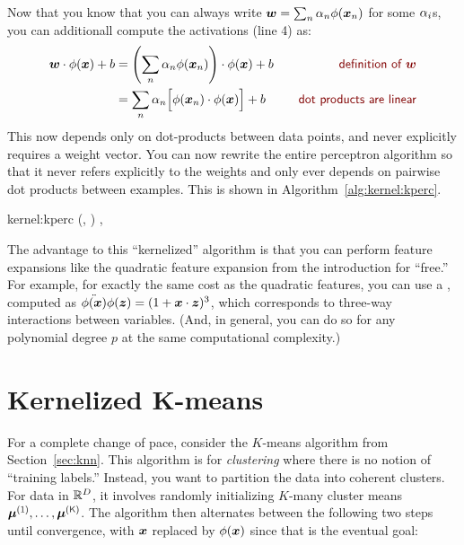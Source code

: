 Now that you know that you can always write ${\boldsymbol{w}} = \sum_n \alpha_n
\phi({\boldsymbol{x}}_n)$ for some $\alpha_i$s, you can additionall compute the
activations (line 4) as:
%
\begin{align}
\dotp{\vw}{\phi(\vx)}+b
&= \dotp{\left( \sum_n \al_n \phi(\vx_n) \right)}{\phi(\vx)} + b
\becauseof{definition of $\vw$} \\
&= \sum_n \al_n \Big[ \dotp{\phi(\vx_n)}{\phi(\vx)} \Big] + b
\becauseof{dot products are linear}
\end{align}
%
This now depends only on dot-products between data points, and never
explicitly requires a weight vector.  You can now rewrite the entire
perceptron algorithm so that it never refers explicitly to the weights
and only ever depends on pairwise dot products between examples.  This
is shown in Algorithm~\ref{alg:kernel:kperc}.

\newalgorithm%
  {kernel:kperc}%
  {(, )}
  {
\ENDIF
\ENDFOR
\ENDFOR
\RETURN \VAR{$\vec\al$}, 
}

The advantage to this ``kernelized'' algorithm is that you can perform
feature expansions like the quadratic feature expansion from the
introduction for ``free.''  For example, for exactly the same cost as
the quadratic features, you can use a ,
computed as $\ddot{\phi({\boldsymbol{x}})}{\phi({\boldsymbol{z}})} = (1 + {\boldsymbol{x}} \cdot {\boldsymbol{z}})^3$,
which corresponds to three-way interactions between variables.  (And,
in general, you can do so for any polynomial degree $p$ at the same
computational complexity.)

\section{Kernelized K-means}

For a complete change of pace, consider the $K$-means algorithm from
Section~\ref{sec:knn}.  This algorithm is for \emph{clustering}
where there is no notion of ``training labels.''  Instead, you want to
partition the data into coherent clusters.  For data in $\mathbb{R}^D$, it
involves randomly initializing $K$-many cluster means $\vec\mu\oth,
\dots, \vec\mu\Kth$.  The algorithm then alternates between the
following two steps until convergence, with ${\boldsymbol{x}}$ replaced by
$\phi({\boldsymbol{x}})$ since that is the eventual goal:

